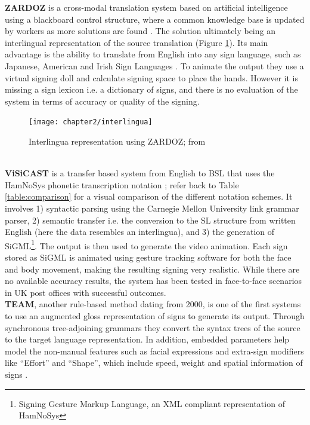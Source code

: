 \documentclass[12pt]{ociamthesis}  %
\begin{document}
\noindent 
\textbf{ZARDOZ} is a cross-modal translation system based on artificial intelligence using a blackboard control structure, where a common knowledge base is updated by workers as more solutions are found . The solution ultimately being an interlingual representation of the source translation (Figure \ref{fig:zardoz}). Its main advantage is the ability to translate from English into any sign language, such as Japanese, American and Irish Sign Languages . To animate the output they use a virtual signing doll and calculate signing space to place the hands. However it is missing a sign lexicon i.e. a dictionary of signs, and there is no evaluation of the system in terms of accuracy or quality of the signing.
\begin{figure}[h]
	\centering
    \texttt{[image: chapter2/interlingua]}
    \caption[Interlingua representation using ZARDOZ]{Interlingua representation using ZARDOZ; from }
    \label{fig:zardoz}
\end{figure}
\\

\noindent 
\textbf{ViSiCAST} is a transfer based system from English to BSL that uses the HamNoSys phonetic transcription notation  ; refer back to Table \ref{table:comparison} for a visual comparison of the different notation schemes. It involves 1) syntactic parsing using the Carnegie Mellon University link grammar parser, 2) semantic transfer i.e. the conversion to the SL structure from written English (here the data resembles an interlingua), and 3) the generation of SiGML\footnote{Signing Gesture Markup Language, an XML compliant representation of HamNoSys}. The output is then used to generate the video animation. Each sign stored as SiGML is animated using gesture tracking software for both the face and body movement, making the resulting signing very realistic. While there are no available accuracy results, the system has been tested in face-to-face scenarios in UK post offices with successful outcomes. \\

\noindent 
\textbf{TEAM}, another rule-based method dating from 2000, is one of the first systems to use an augmented gloss representation of signs to generate its output. Through synchronous tree-adjoining grammars they convert the syntax trees of the source to the target language representation. In addition, embedded parameters help model the non-manual features such as facial expressions and extra-sign modifiers like ``Effort'' and ``Shape'', which include speed, weight and spatial information of signs . 
\end{document}
